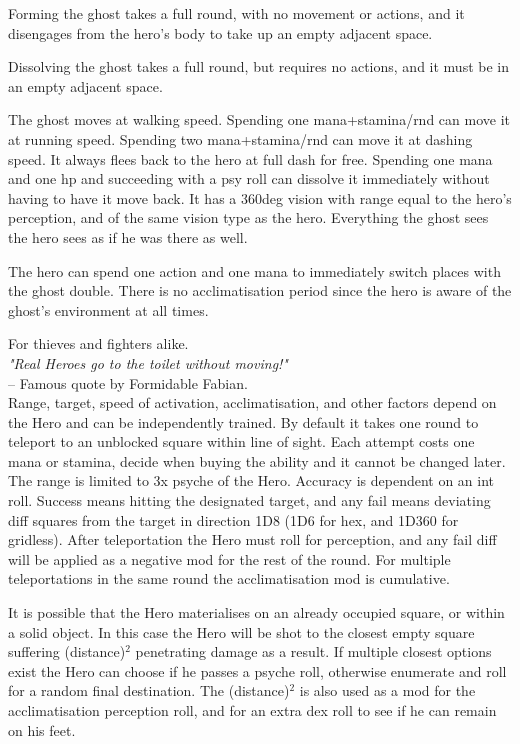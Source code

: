 Forming the ghost takes a full round, with no movement or actions, and it disengages from the hero's body to take up an empty adjacent space.

Dissolving the ghost takes a full round, but requires no actions, and it must be in an empty adjacent space.

The ghost moves at walking speed. Spending one mana+stamina/rnd can move it at running speed. Spending two mana+stamina/rnd can move it at dashing speed. It always flees back to the hero at full dash for free. Spending one mana and one hp and succeeding with a psy roll can dissolve it immediately without having to have it move back.
It has a 360deg vision with range equal to the hero's perception, and of the same vision type as the hero. Everything the ghost sees the hero sees as if he was there as well.

The hero can spend one action and one mana to immediately switch places with the ghost double. There is no acclimatisation period since the hero is aware of the ghost's environment at all times.


 For thieves and fighters alike.\\
\emph{"Real Heroes go to the toilet without moving!"}\\
-- Famous quote by Formidable Fabian.\\
Range, target, speed of activation, acclimatisation, and other factors depend on the Hero and can be independently trained. By default it takes one round to teleport to an unblocked square within line of sight. Each attempt costs one mana or stamina, decide when buying the ability and it cannot be changed later. The range is limited to 3x psyche of the Hero. Accuracy is dependent on an int roll. Success means hitting the designated target, and any fail means deviating diff squares from the target in direction 1D8 (1D6 for hex, and 1D360 for gridless). After teleportation the Hero must roll for perception, and any fail diff will be applied as a negative mod for the rest of the round. For multiple teleportations in the same round the acclimatisation mod is cumulative.

It is possible that the Hero materialises on an already occupied square, or within a solid object. In this case the Hero will be shot to the closest empty square suffering (distance)$^2$ penetrating damage as a result. If multiple closest options exist the Hero can choose if he passes a psyche roll, otherwise enumerate and roll for a random final destination. The (distance)$^2$ is also used as a mod for the acclimatisation perception roll, and for an extra dex roll to see if he can remain on his feet.

